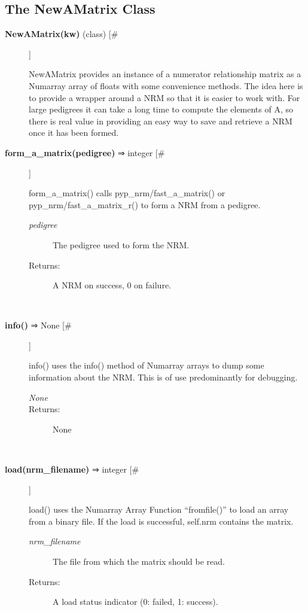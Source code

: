 \subsection*{The NewAMatrix Class}
\begin{description}
\item[\textbf{NewAMatrix(kw)}
 (class) [\#]]

 NewAMatrix provides an instance of a numerator relationship matrix as a Numarray array of floats with some convenience methods. The idea here is to provide a wrapper around a NRM so that it is easier to work with. For large pedigrees it can take a long time to compute the elements of A, so there is real value in providing an easy way to save and retrieve a NRM once it has been formed.

\item[\textbf{form\_a\_matrix(pedigree)}
 ⇒ integer [\#]]

 form\_a\_matrix() calls pyp\_nrm/fast\_a\_matrix() or pyp\_nrm/fast\_a\_matrix\_r() to form a NRM from a pedigree.
\begin{description}
\item[\emph{pedigree}
] The pedigree used to form the NRM.
\item[Returns:] A NRM on success, 0 on failure.

\end{description}
\\ 

\item[\textbf{info()}
 ⇒ None [\#]]

 info() uses the info() method of Numarray arrays to dump some information about the NRM. This is of use predominantly for debugging.
\begin{description}
\item[\emph{None}
]
\item[Returns:] None

\end{description}
\\ 

\item[\textbf{load(nrm\_filename)}
 ⇒ integer [\#]]

 load() uses the Numarray Array Function ``fromfile()'' to load an array from a binary file. If the load is successful, self.nrm contains the matrix.
\begin{description}
\item[\emph{nrm\_filename}
] The file from which the matrix should be read.
\item[Returns:] A load status indicator (0: failed, 1: success).


\end{description}
\end{description}
